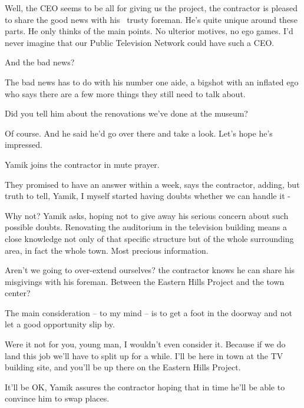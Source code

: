 \documentclass[letterpaper]{article}
\begin{document}
{\textquotedbl}Well, the CEO seems to be all for giving us the project,{\textquotedbl} the contractor is pleased to
share the good news with his \ trusty foreman. {\textquotedbl}He's quite unique around these parts. He only thinks of
the main points. No ulterior motives, no ego games. I'd never imagine that our Public Television Network could have
such a CEO.{\textquotedbl}

{\textquotedbl}And the bad news?{\textquotedbl} 

{\textquotedbl}The bad news has to do with his number one aide, a bigshot with an inflated ego who says there are a few
more things they still need to talk about.{\textquotedbl} 

{\textquotedbl}Did you tell him about the renovations we've done at the museum?{\textquotedbl} 

{\textquotedbl}Of course. And he said he'd go over there and take a look. Let's hope he's impressed.{\textquotedbl} 

Yamik joins the contractor in mute prayer. 

{\textquotedbl}They promised to have an answer within a week,{\textquotedbl} says the contractor{,}
adding, {\textquotedbl}but truth to tell, Yamik, I myself started having doubts whether we can handle it
-{\textquotedbl} 

{\textquotedbl}Why not?{\textquotedbl} Yamik asks, hoping not to give away his serious{ }concern about
such possible doubts. Renovating the auditorium in the television building means a close knowledge not only of that
specific structure but of the whole surrounding area, in fact the whole town. Most precious information. ~

{\textquotedbl}Aren't we going to over-extend ourselves?{\textquotedbl} the contractor knows he can share his misgivings
with his foreman. {\textquotedbl}Between the Eastern Hills Project and the town center?{\textquotedbl} 

{\textquotedbl}The main consideration -- to my mind -- is to get a foot in the doorway and not let a good opportunity
slip by.{\textquotedbl} 

{\textquotedbl}Were it not for you, young man, I wouldn't even consider it. Because if we do land this job we'll have to
split up for a while. I'll be here in town at the TV building site, and you'll be up there on the Eastern Hills
Project.{\textquotedbl} 

{\textquotedbl}It'll be OK,{\textquotedbl} Yamik assures the contractor hoping that in time he'll be able to convince
him to swap places. ~
\end{document}
